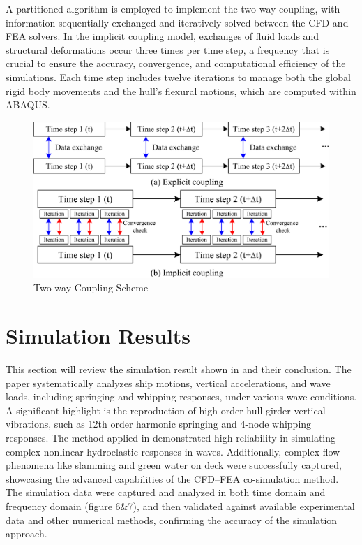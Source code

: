 \documentclass[12pt]{article} %
\begin{document}
A partitioned algorithm is employed to implement the two-way coupling, with information sequentially exchanged and iteratively solved 
between the CFD and FEA solvers. In the implicit coupling model, exchanges of fluid loads and structural deformations occur three times 
per time step, a frequency that is crucial to ensure the accuracy, convergence, and computational efficiency of the simulations. 
Each time step includes twelve iterations to manage both the global rigid body movements and the hull’s flexural motions, which are computed within ABAQUS.
\begin{figure}[ht]
    \centering
    \includegraphics[width=1\textwidth]{Loop.png}
    \caption{ Two-way Coupling Scheme\cite{4}}
\end{figure}
\section{Simulation Results}
This section will review the simulation result shown in\cite{4} and their conclusion.
The paper\cite{4} systematically analyzes ship motions, vertical accelerations, and wave loads, including springing and whipping responses, under various wave conditions. A significant highlight is the reproduction of high-order hull girder vertical vibrations, such as 12th order harmonic springing and 4-node whipping responses.
The method applied in\cite{4} demonstrated high reliability in simulating complex nonlinear hydroelastic responses in waves. Additionally, complex flow phenomena like slamming and green water on deck were successfully captured, showcasing the advanced capabilities of the CFD–FEA co-simulation method.
The simulation data were captured and analyzed in both time domain and frequency domain (figure 6\&7), and then validated against available experimental data and other numerical methods, confirming the accuracy of the simulation approach.
\end{document}
